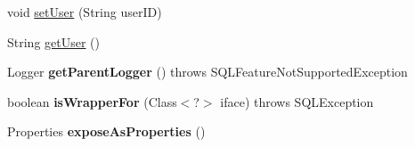 \begin{DoxyCompactItemize}
\item 
void \mbox{\hyperlink{classcom_1_1mysql_1_1cj_1_1jdbc_1_1_mysql_data_source_a34a8c203cf757fa8e40e88e5af2cff0b}{set\+User}} (String user\+ID)
\item 
String \mbox{\hyperlink{classcom_1_1mysql_1_1cj_1_1jdbc_1_1_mysql_data_source_a22e84365059e1c1e6e29c9999a31d6b0}{get\+User}} ()
\item 
\mbox{\label{classcom_1_1mysql_1_1cj_1_1jdbc_1_1_mysql_data_source_a320d8f29b68ec73d1643cf8c8d6b38b7}} 
Logger {\bfseries get\+Parent\+Logger} ()  throws S\+Q\+L\+Feature\+Not\+Supported\+Exception 
\item 
\mbox{\label{classcom_1_1mysql_1_1cj_1_1jdbc_1_1_mysql_data_source_ad0952d8622440b80d28bb8cdb537f97b}} 
boolean {\bfseries is\+Wrapper\+For} (Class$<$?$>$ iface)  throws S\+Q\+L\+Exception 
\item 
\mbox{\label{classcom_1_1mysql_1_1cj_1_1jdbc_1_1_mysql_data_source_aadf54f3a0615c93d0c47fd2baf0b7884}} 
Properties {\bfseries expose\+As\+Properties} ()
\end{DoxyCompactItemize}
